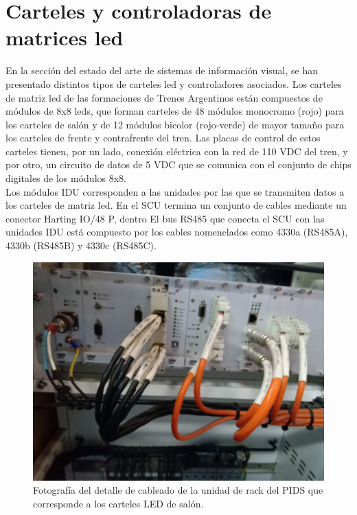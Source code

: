 \section{Carteles y controladoras de matrices led}
En la sección del estado del arte de sistemas de información visual, se han presentado distintos tipos de carteles led y controladores asociados. Los carteles de matriz led de las formaciones de Trenes Argentinos están compuestos de módulos de 8x8 leds, que forman carteles de 48 módulos monocromo (rojo) para los carteles de salón y de 12 módulos bicolor (rojo-verde) de mayor tamaño para los carteles de frente y contrafrente del tren. Las placas de control de estos carteles tienen, por un lado, conexión eléctrica con la red de 110 VDC del tren, y por otro, un circuito de datos de 5 VDC que se comunica con el conjunto de chips digitales de los módulos 8x8. \\

Los módulos IDU corresponden a las unidades por las que se transmiten datos a los carteles de matriz led. En el SCU termina un conjunto de cables mediante un conector Harting IO/48 P, dentro El bus RS485 que conecta el SCU con las unidades IDU está compuesto por los cables nomenclados como 4330a (RS485A), 4330b (RS485B) y 4330c (RS485C). 

\begin{figure}[ht]
	\centering
	\includegraphics[width=1\textwidth ]{./Figures/rackPIDS2.jpg}
	\caption{Fotografía del detalle de cableado de la unidad de rack del PIDS que corresponde a los carteles LED de salón.}
	\label{fig:rackPIDS2}
\end{figure}



